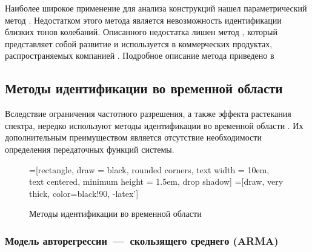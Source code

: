 Наиболее широкое применение для анализа конструкций нашел параметрический метод  \cite{lib:oma:Guillaume}. Недостатком этого метода является невозможность идентификации близких тонов колебаний. Описанного недостатка лишен метод , который представляет собой развитие  и используется в коммерческих продуктах, распространяемых компанией . Подробное описание метода приведено в \cite{lib:oma:Peeters&Auweraer}

\subsection{Методы идентификации во временной области}

Вследствие ограничения частотного разрешения, а также эффекта растекания спектра, нередко используют методы идентификации во временной области . Их дополнительным преимуществом является отсутствие необходимости определения передаточных функций системы.

\begin{figure}[H]
	\centering
	=[rectangle, draw = black, rounded corners, text width = 10em, text centered, minimum height = 1.5em, drop shadow]
	=[draw, very thick, color=black!90, -latex']
	\caption{Методы идентификации во временной области}\label{fig:schemeTimeDomainOMA}
\end{figure}

\subsubsection{Модель авторегрессии~---~скользящего среднего (ARMA)}

